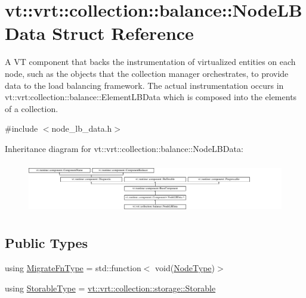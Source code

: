\hypertarget{structvt_1_1vrt_1_1collection_1_1balance_1_1_node_l_b_data}{}\section{vt\+:\+:vrt\+:\+:collection\+:\+:balance\+:\+:Node\+L\+B\+Data Struct Reference}
\label{structvt_1_1vrt_1_1collection_1_1balance_1_1_node_l_b_data}


A VT component that backs the instrumentation of virtualized entities on each node, such as the objects that the collection manager orchestrates, to provide data to the load balancing framework. The actual instrumentation occurs in {\ttfamily vt\+::vrt\+:collection\+:}\+:balance\+::\+Element\+L\+B\+Data which is composed into the elements of a collection.  




{\ttfamily \#include $<$node\+\_\+lb\+\_\+data.\+h$>$}

Inheritance diagram for vt\+:\+:vrt\+:\+:collection\+:\+:balance\+:\+:Node\+L\+B\+Data\+:\begin{figure}[H]
\begin{center}
\leavevmode
\includegraphics[height=2.272727cm]{structvt_1_1vrt_1_1collection_1_1balance_1_1_node_l_b_data}
\end{center}
\end{figure}
\subsection*{Public Types}
\begin{DoxyCompactItemize}
\item 
using \hyperlink{structvt_1_1vrt_1_1collection_1_1balance_1_1_node_l_b_data_a200140e389d08dc8d74db16589e736bc}{Migrate\+Fn\+Type} = std\+::function$<$ void(\hyperlink{namespacevt_a866da9d0efc19c0a1ce79e9e492f47e2}{Node\+Type})$>$
\item 
using \hyperlink{structvt_1_1vrt_1_1collection_1_1balance_1_1_node_l_b_data_adf6ad57c147c8e9d6b47e07a437bb1a6}{Storable\+Type} = \hyperlink{structvt_1_1vrt_1_1collection_1_1storage_1_1_storable}{vt\+::vrt\+::collection\+::storage\+::\+Storable}
\end{DoxyCompactItemize}

